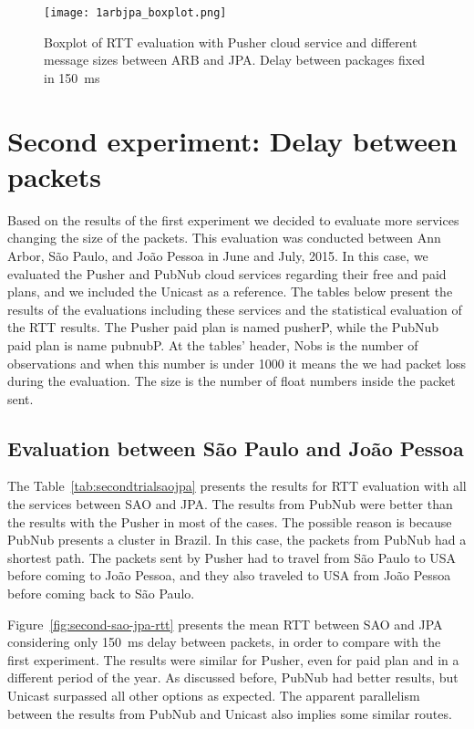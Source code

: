 \begin{figure}[!ht]
	\centering
	\texttt{[image: 1arbjpa\_boxplot.png]}
	\caption{Boxplot of RTT evaluation with Pusher cloud service and different message sizes between ARB and JPA. Delay between packages fixed in 150~ms}
	\label{fig:arb-jpa-boxplot}
\end{figure}


\section{Second experiment: Delay between packets}
\label{sec:secondtrial}

Based on the results of the first experiment we decided to evaluate more services changing the size of the packets.
This evaluation was conducted between Ann Arbor, São Paulo, and João Pessoa in June and July, 2015.
In this case, we evaluated the Pusher and PubNub cloud services regarding their free and paid plans, and we included the Unicast as a reference.
The tables below present the results of the evaluations including these services and the statistical evaluation of the RTT results.
The Pusher paid plan is named pusherP, while the PubNub paid plan is name pubnubP.
At the tables' header, Nobs is the number of observations and when this number is under 1000 it means the we had packet loss during the evaluation.
The size is the number of float numbers inside the packet sent.

\subsection*{Evaluation between São Paulo and João Pessoa} 

The Table~\ref{tab:secondtrialsaojpa} presents the results for RTT evaluation with all the services between SAO and JPA.
The results from PubNub were better than the results with the Pusher in most of the cases.
The possible reason is because PubNub presents a cluster in Brazil.
In this case, the packets from PubNub had a shortest path.
The packets sent by Pusher had to travel from São Paulo to USA before coming to João Pessoa, and they also traveled to USA from João Pessoa before coming back to São Paulo.

Figure~\ref{fig:second-sao-jpa-rtt} presents the mean RTT between SAO and JPA considering only 150~ms delay between packets, in order to compare with the first experiment.
The results were similar for Pusher, even for paid plan and in a different period of the year.
As discussed before, PubNub had better results, but Unicast surpassed all other options as expected.
The apparent parallelism between the results from PubNub and Unicast also implies some similar routes.

